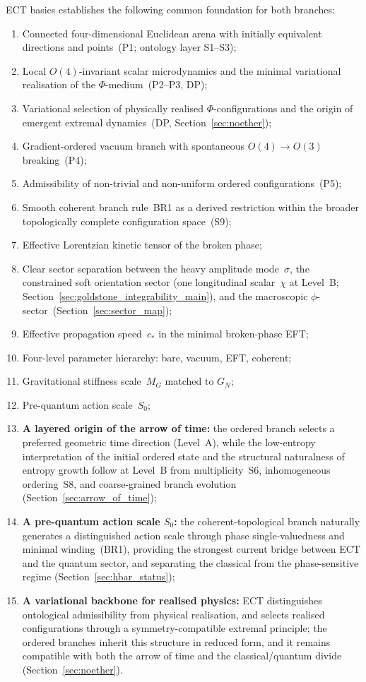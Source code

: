 \documentclass[11pt,a4paper]{article}
\numberwithin{equation}{section}
\begin{document}
ECT basics establishes the following common foundation for both branches:
\begin{enumerate}
  \item Connected four-dimensional Euclidean arena with initially
    equivalent directions and points~(P1; ontology layer S1--S3);
  \item Local $O(4)$-invariant scalar microdynamics and the minimal
    variational realisation of the $\Phi$-medium~(P2--P3, DP);
  \item Variational selection of physically realised $\Phi$-configurations
    and the origin of emergent extremal dynamics~(DP,
    Section~\ref{sec:noether});
  \item Gradient-ordered vacuum branch with spontaneous
    $O(4)\to O(3)$ breaking~(P4);
  \item Admissibility of non-trivial and non-uniform ordered
    configurations~(P5);
  \item Smooth coherent branch rule~BR1 as a derived restriction within
    the broader topologically complete configuration space~(S9);
  \item Effective Lorentzian kinetic tensor of the broken phase;
  \item Clear sector separation between the heavy amplitude mode~$\sigma$,
    the constrained soft orientation sector (one longitudinal scalar~$\chi$
    at Level~B; Section~\ref{sec:goldstone_integrability_main}),
    and the macroscopic $\phi$-sector~(Section~\ref{sec:sector_map});
  \item Effective propagation speed~$c_*$ in the minimal broken-phase EFT;
  \item Four-level parameter hierarchy: bare, vacuum, EFT, coherent;
  \item Gravitational stiffness scale~$M_G$ matched to $G_N$;
  \item Pre-quantum action scale~$S_0$;
  \item \textbf{A layered origin of the arrow of time:}
    the ordered branch selects a preferred geometric time direction
    (Level~A), while the low-entropy interpretation of the initial
    ordered state and the structural naturalness of entropy growth
    follow at Level~B from multiplicity~S6, inhomogeneous
    ordering~S8, and coarse-grained branch evolution
    (Section~\ref{sec:arrow_of_time});
  \item \textbf{A pre-quantum action scale $S_0$:}
    the coherent-topological branch naturally generates a distinguished
    action scale through phase single-valuedness and minimal winding~(BR1),
    providing the strongest current bridge between ECT and the quantum
    sector, and separating the classical from the phase-sensitive regime
    (Section~\ref{sec:hbar_status});
  \item \textbf{A variational backbone for realised physics:}
    ECT distinguishes ontological admissibility from physical
    realisation, and selects realised configurations through a
    symmetry-compatible extremal principle; the ordered branches
    inherit this structure in reduced form, and it remains compatible
    with both the arrow of time and the classical/quantum divide
    (Section~\ref{sec:noether}).
\end{enumerate}
\end{document}
